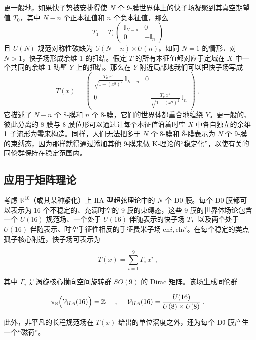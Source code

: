 \documentclass[11pt,a4paper]{ctexart}
\newcommand{\SrcRange}[2]{\marginpar{\raggedright\footnotesize 原文 p.#1}}
\begin{document}
更一般地，如果快子势被安排得使 \(N\) 个 9-膜世界体上的快子场凝聚到其真空期望值 \(T_0\)，其中 \(N-n\) 个正本征值和 \(n\) 个负本征值，那么 \[T_0=T_v
\left( \begin{array}{cc}{\mathbb{I}}_{N-n} & 0\\ 0 & -{\mathbb{I}}_{n}
\end{array}\right)\] 且 \(U(N)\) 规范对称性破缺为 \(U(N-n)\times U(n)\)。如同 \(N=1\) 的情形，对 \(N>1\)，快子场形成余维 1 的扭结。假定 \(T\) 的所有本征值都对应于定域在 \(X\) 中一个共同的余维 1 畴壁 \(Y\) 上的扭结。那么在 \(Y\) 附近局部地我们可以把快子场写成 \[T(x)=
\left( \begin{array}{cc}\frac{T_v\,x^9}{\sqrt{1+(x^9)^2}}\,{\mathbb{I}}_{N-n}& 0\\
0&-\frac{T_v\,x^9}{\sqrt{1+(x^9)^2}}\,{\mathbb{I}}_{n}\end{array}\right)\ ,\] 它描述了 \(N-n\) 个 8-膜和 \(n\) 个 \(\overline{8}\)-膜，它们的世界体都重合地缠绕 \(Y\)。更一般的、彼此分离的 8-膜与 \(\overline{8}\)-膜位形可以通过让每个本征值沿着时空 \(X\) 中各自独立的余维 1 子流形为零来构造。同样，人们无法把多于 \(N\) 个 8-膜和 \(\overline{8}\)-膜表示为 \(N\) 个 9-膜的束缚态，因为那样就得通过添加其他 9-膜来做 K-理论的``稳定化''，以使有关的同伦群保持在稳定范围内。

\SrcRange{51}{51}
\subsection{应用于矩阵理论}\label{ux5e94ux7528ux4e8eux77e9ux9635ux7406ux8bba}

考虑 \({\mathbb{R}}^{10}\)（或其某种紧化）上 IIA 型超弦理论中的 \(N\) 个 D0-膜。每个 D0-膜都可以表示为 16 个不稳定的、充满时空的 9-膜的束缚态，这些 9-膜的世界体场论包含一个 \(U(16)\) 规范场、一个处于 \(U(16)\) 伴随表示的快子场 \(T\)，以及两个处于 \(U(16)\) 伴随表示、时空手征性相反的手征费米子场 \(\mathrm{ch}i, \mathrm{ch}i'\)。在每个稳定的类点孤子核心附近，快子场可表示为

\[T(x)=\sum_{i=1}^9\Gamma_i\, x^i\ ,\]

其中 \(\Gamma_i\) 是涡旋核心横向空间旋转群 \(SO(9)\) 的 Dirac 矩阵。该场生成同伦群

\[\pi_8\Bigl({\mathcal V}_{\mathrm IIA}(16)\Bigr)= {\mathbb{Z}}\ \ \ \ ,\ \ \ \
{\mathcal V}_{\mathrm IIA}(16)=\frac{U(16)}{U(8)\times U(8)}\ .\]

此外，非平凡的长程规范场在 \(T(x)\) 给出的单位涡度之外，还为每个 D0-膜产生一个``磁荷''。
\end{document}
